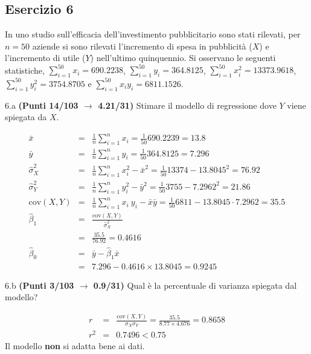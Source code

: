 \documentclass[
  11pt,
]{book}
\theoremstyle{mytheoremstyle}
\theoremstyle{mydefstyle}
\newenvironment{sol}
  {
  \begin{tcolorbox}[enhanced,breakable,arc=0.1mm,boxrule=1pt,colback=white,colframe=iblue,
  title=\bf \fontfamily{lmss}\selectfont \hspace{.5 cm} Soluzione,drop fuzzy shadow]

}{
\end{tcolorbox}
  }
\begin{document}
\subsection{Esercizio 6}\label{esercizio-6-24}

In uno studio sull'efficacia dell'investimento pubblicitario sono stati rilevati, per \(n=50\) aziende si sono rilevati l'incremento di spesa in
pubblicità (\(X\)) e l'incremento di utile (\(Y\)) nell'ultimo quinquennio. Si osservano le seguenti statistiche, \(\sum_{i=1}^{50}x_i=690.2238\), \(\sum_{i=1}^{50}y_i=364.8125\),
\(\sum_{i=1}^{50}x_i^2=13373.9618\), \(\sum_{i=1}^{50}y_i^2=3754.8705\) e \(\sum_{i=1}^{50}x_iy_i=6811.1526\).

6.a \textbf{(Punti 14/103 \(\rightarrow\) 4.21/31)} Stimare il modello di regressione dove \(Y\) viene spiegata da \(X\).

\begin{sol}
\begin{eqnarray*}
           \bar x &=&\frac 1 n\sum_{i=1}^n x_i = \frac {1}{ 50 }  690.2239 =  13.8 \\
           \bar y &=&\frac 1 n\sum_{i=1}^n y_i = \frac {1}{ 50 }  364.8125 =  7.296 \\
           \hat\sigma_X^2&=&\frac 1 n\sum_{i=1}^n x_i^2-\bar x^2=\frac {1}{ 50 }  13374  - 13.8045 ^2= 76.92 \\
           \hat\sigma_Y^2&=&\frac 1 n\sum_{i=1}^n y_i^2-\bar y^2=\frac {1}{ 50 }  3755  - 7.2962 ^2= 21.86 \\
           \text{cov}(X,Y)&=&\frac 1 n\sum_{i=1}^n x_i~y_i-\bar x\bar y=\frac {1}{ 50 }  6811 - 13.8045 \cdot 7.2962 = 35.5 \\
           \hat\beta_1 &=& \frac{\text{cov}(X,Y)}{\hat\sigma_X^2} \\
                    &=& \frac{ 35.5 }{ 76.92 }  =  0.4616 \\
           \hat\beta_0 &=& \bar y - \hat\beta_1 \bar x\\
                    &=&  7.296 - 0.4616 \times  13.8045 = 0.9245 
         \end{eqnarray*}

\end{sol}

6.b \textbf{(Punti 3/103 \(\rightarrow\) 0.9/31)} Qual è la percentuale di varianza spiegata dal modello?

\begin{sol}
\begin{eqnarray*}
r&=&\frac{\text{cov}(X,Y)}{\sigma_X\sigma_Y}=\frac{ 35.5 }{ 8.77 \times 4.676 }= 0.8658 \\r^2&=& 0.7496 < 0.75
\end{eqnarray*}
Il modello \textbf{non} si adatta bene ai dati.

\end{sol}
\end{document}
